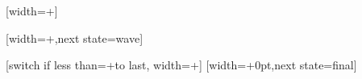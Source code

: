 %
%
%

%


%
%
%



%
%
%
%


%

{%
  [width=+\pgfdecorationsegmentlength]
  {
    \pgfpathmoveto{\pgfqpoint{0pt}{\pgfdecorationsegmentamplitude}}
    \pgfpathlineto{\pgfqpoint{0pt}{-\pgfdecorationsegmentamplitude}}
  }%
  {
    \pgfpathmoveto{\pgfqpoint{0pt}{\pgfdecorationsegmentamplitude}}
    \pgfpathlineto{\pgfqpoint{0pt}{-\pgfdecorationsegmentamplitude}}
    \pgfpathmoveto{\pgfpointdecoratedpathlast}
  }%
}%



%

{%
  [width=+\pgfdecorationsegmentlength,next state=wave]
  {}%

  [switch if less than=+\pgfdecorationsegmentlength to last,
               width=+\pgfdecorationsegmentlength]
  {
    \pgfpathmoveto{
      \pgfpointadd
      {\pgfqpoint{-\pgfdecoratedcompleteddistance}{0pt}}%
      {\pgfpointpolar{\pgfdecorationsegmentangle}{+\pgfdecoratedcompleteddistance}}}%
    \pgfpatharc{\pgfdecorationsegmentangle}{-\pgfdecorationsegmentangle}{+\pgfdecoratedcompleteddistance}%
  }%
  [width=+0pt,next state=final]
  {
    \pgfpathmoveto{
      \pgfpointadd
      {\pgfqpoint{-\pgfdecoratedcompleteddistance}{0pt}}%
      {\pgfpointpolar{\pgfdecorationsegmentangle}{+\pgfdecoratedcompleteddistance}}}%
    \pgfpatharc{\pgfdecorationsegmentangle}{-\pgfdecorationsegmentangle}{+\pgfdecoratedcompleteddistance}%
  }%
  {
    \pgfpathmoveto{\pgfpointdecoratedpathlast}
  }%
}%



